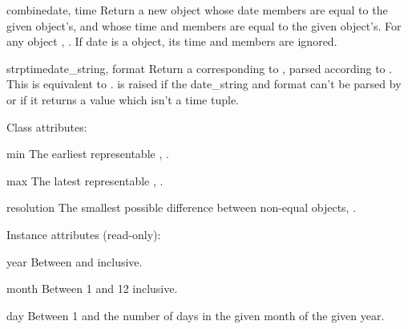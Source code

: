 \begin{methoddesc}{combine}{date, time}
  Return a new  object whose date members are
  equal to the given  object's, and whose time
  and  members are equal to the given  object's.
  For any  object , .  If date is a
   object, its time and  members are
  ignored.
  \end{methoddesc}

\begin{methoddesc}{strptime}{date_string, format}
  Return a  corresponding to , parsed
  according to .  This is equivalent to
  .  is raised if the date_string and
  format can't be parsed by  or if it returns a
  value which isn't a time tuple.

\end{methoddesc}

Class attributes:

\begin{memberdesc}{min}
  The earliest representable ,
  .
\end{memberdesc}

\begin{memberdesc}{max}
  The latest representable ,
  .
\end{memberdesc}

\begin{memberdesc}{resolution}
  The smallest possible difference between non-equal 
  objects, .
\end{memberdesc}

Instance attributes (read-only):

\begin{memberdesc}{year}
  Between  and  inclusive.
\end{memberdesc}

\begin{memberdesc}{month}
  Between 1 and 12 inclusive.
\end{memberdesc}

\begin{memberdesc}{day}
  Between 1 and the number of days in the given month of the given
  year.
\end{memberdesc}

